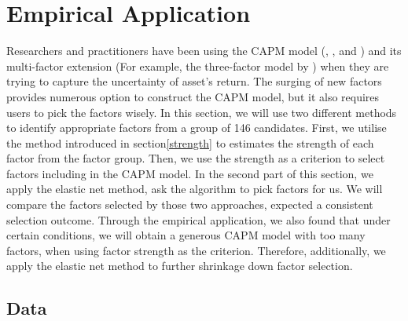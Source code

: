 




%
	\section{Empirical Application}\label{Empirical}
	
Researchers and practitioners have been using the CAPM model (, , and ) and its multi-factor extension (For example, the three-factor model by ) when they are trying to capture the uncertainty of asset's return.
The surging of new factors \cite{Harvey2019} provides numerous option to construct the CAPM model, but it also requires users to pick the factors wisely.
In this section, we will use two different methods to identify appropriate factors from a group of 146 candidates.
First, we utilise the method introduced in section\ref{strength} to estimates the strength of each factor from the factor group.
Then, we use the strength as a criterion to select factors including in the CAPM model.
In the second part of this section, we apply the elastic net method, ask the algorithm to pick factors for us.
We will compare the factors selected by those two approaches, expected a consistent selection outcome.
Through the empirical application, we also found that under certain conditions, we will obtain a generous CAPM model with too many factors, when using factor strength as the criterion.
Therefore, additionally, we apply the elastic net method to further shrinkage down factor selection.
	\subsection{Data}\label{data}
	
